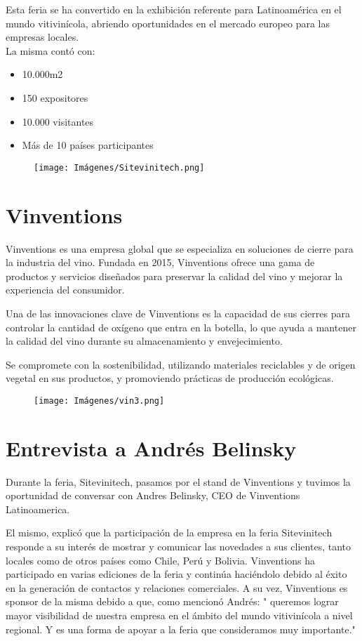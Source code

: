  Esta feria se ha convertido en la exhibición referente para Latinoamérica en el mundo vitivinícola, abriendo oportunidades en el mercado europeo para las empresas locales. \\
 
La misma contó con:
\begin{itemize}
\item 10.000m2
\item 150 expositores
\item 10.000 visitantes
\item Más de 10 países participantes
\end{itemize}

\begin{figure}[h]
    \centering
    \texttt{[image: Imágenes/Sitevinitech.png]}
\end{figure}

\section{Vinventions}

Vinventions es una empresa global que se especializa en soluciones de cierre para la industria del vino. Fundada en 2015, Vinventions ofrece una gama de productos y servicios diseñados para preservar la calidad del vino y mejorar la experiencia del consumidor.

Una de las innovaciones clave de Vinventions es la capacidad de sus cierres para controlar la cantidad de oxígeno que entra en la botella, lo que ayuda a mantener la calidad del vino durante su almacenamiento y envejecimiento.

Se compromete con la sostenibilidad, utilizando materiales reciclables y de origen vegetal en sus productos, y promoviendo prácticas de producción ecológicas.
\begin{figure}[h]
    \centering
    \texttt{[image: Imágenes/vin3.png]}
\end{figure}


\section{Entrevista a Andrés Belinsky}

Durante la feria, Sitevinitech, pasamos por el stand de Vinventions y tuvimos la oportunidad de conversar con Andres Belinsky, CEO de Vinventions Latinoamerica. 

El mismo, explicó que la participación de la empresa en la feria Sitevinitech responde a su interés de mostrar y comunicar las novedades a sus clientes, tanto locales como de otros países como Chile, Perú y Bolivia. Vinventions ha participado en varias ediciones de la feria y continúa haciéndolo debido al éxito en la generación de contactos y relaciones comerciales. A su vez, Vinventions es sponsor de la misma debido a que, como mencionó Andrés: " queremos lograr mayor visibilidad de nuestra empresa en el ámbito del mundo vitivinícola a nivel regional.  Y es una forma de apoyar a la feria que consideramos muy importante."



